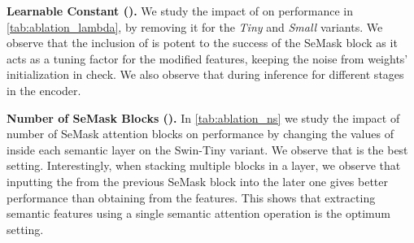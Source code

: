 \documentclass[10pt,twocolumn,letterpaper]{article}
\newcommand{\vspaceundertab}{\vspace{-.2cm}}
\begin{document}
\noindent
\textbf{Learnable Constant ().} We study the impact of  on performance in \cref{tab:ablation_lambda}, by removing it for the \textit{Tiny} and \textit{Small} variants. We observe that the inclusion of  is potent to the success of the SeMask block as it acts as a tuning factor for the modified features, keeping the noise from weights' initialization in check. We also observe that  during inference for different stages in the encoder.

\begin{table}
  \centering
  \fontsize{10}{12}\selectfont
  \vspaceundertab
  \caption{\textbf{Ablation on .} 
        We support the critical claim of the learnable scalar constant:  inside the SeMask Block by removing and recording the mIoU~().}
    \label{tab:ablation_lambda}
\end{table}

\noindent
\textbf{Number of SeMask Blocks ().} In \cref{tab:ablation_ns} we study the impact of number of SeMask attention blocks on performance by changing the values of  inside each semantic layer on the Swin-Tiny variant. We observe that  is the best setting. 
Interestingly, when stacking multiple blocks in a layer, we observe that inputting the  from the previous SeMask block into the later one gives better performance than obtaining  from the features. This shows that extracting semantic features using a single semantic attention operation is the optimum setting.

\begin{table}
  \centering
  \fontsize{10}{12}\selectfont
  \vspaceundertab
  \caption{\textbf{Ablation on .} 
        We experiment with different combinations of  on the SeMask-Tiny variant and report mIoU~().  is the best setting.}
    \label{tab:ablation_ns}
\end{table}
\end{document}
